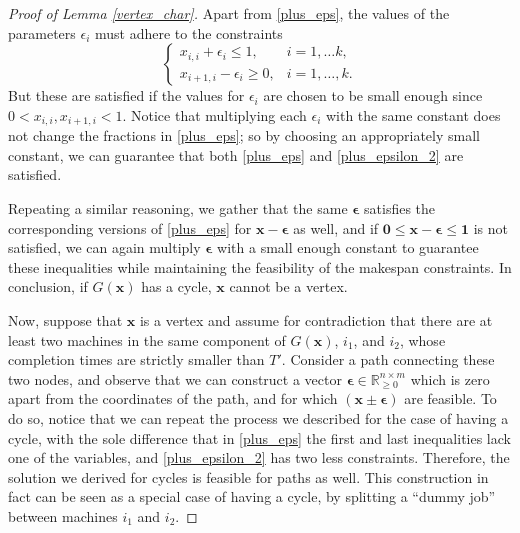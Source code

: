 \documentclass[a4paper,UKenglish,cleveref, autoref, thm-restate, pdfa]{lipics-v2021}
\theoremstyle{plain}
\begin{document}
\begin{proof}[Proof of Lemma \ref{vertex_char}]
    Apart from \eqref{plus_eps}, the values of the parameters $\epsilon_i$ must adhere to the constraints
    \begin{equation}\label{plus_epsilon_2}
    \begin{cases}
        x_{i,i} + \epsilon_i \le 1, & i = 1, \ldots k, \\
        x_{i+1,i} -\epsilon_i \ge 0, & i = 1, \ldots, k.
    \end{cases}
    \end{equation}
    But these are satisfied if the values for $\epsilon_i$ are chosen to be small enough since $0 < x_{i,i}, x_{i+1, i} < 1$. Notice that multiplying each $\epsilon_i$ with the same constant does not change the fractions in \eqref{plus_eps}; so by choosing an appropriately small constant, we can guarantee that both \eqref{plus_eps} and \eqref{plus_epsilon_2} are satisfied.

    Repeating a similar reasoning, we gather that the same $\bm{\epsilon}$ satisfies the corresponding versions of \eqref{plus_eps} for $\bm{x}-\bm{\epsilon}$ as well, and if $\bm{0} \le \bm{x}-\bm{\epsilon} \le \mathbf{1}$ is not satisfied, we can again multiply $\bm{\epsilon}$ with a small enough constant to guarantee these inequalities while maintaining the feasibility of the makespan constraints. In conclusion, if $G(\bm{x})$ has a cycle, $\bm{x}$ cannot be a vertex.

    Now, suppose that $\bm{x}$ is a vertex and assume for contradiction that there are at least two machines in the same component of $G(\bm{x})$, $i_1$, and $i_2$, whose completion times are strictly smaller than $T'$. Consider a path connecting these two nodes, and observe that we can construct a vector $\bm{\epsilon} \in \mathbb{R}_{\ge 0} ^{n\times m}$ which is zero apart from the coordinates of the path, and for which $(\bm{x}\pm\bm{\epsilon})$ are feasible. To do so, notice that we can repeat the process we described for the case of having a cycle, with the sole difference that in \eqref{plus_eps} the first and last inequalities lack one of the variables, and \eqref{plus_epsilon_2} has two less constraints. Therefore, the solution we derived for cycles is feasible for paths as well. This construction in fact can be seen as a special case of having a cycle, by splitting a ``dummy job'' between machines $i_1$ and $i_2$.


\end{proof}
\end{document}
